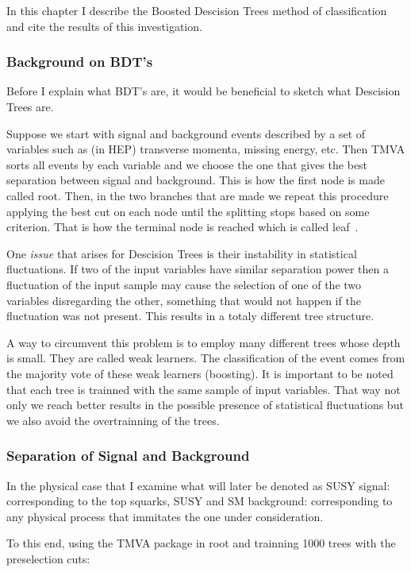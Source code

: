 \documentclass[12pt,a4paper]{report}
\begin{document}
In this chapter I describe the Boosted Descision Trees method of classification and cite the results of this 
investigation.

\subsubsection{Background on BDT's}

Before I explain what BDT's are, it would be beneficial to sketch what Descision Trees are. 

Suppose we start with signal and background events described by a set of variables such as (in HEP) transverse 
momenta, missing energy, etc. Then TMVA sorts all events by each variable and we choose the one that gives the
best separation between signal and background. This is how the first node is made called root. Then, in the two branches 
that are made we repeat this procedure applying the best cut on each node until the splitting stops based on 
some criterion. That is how the terminal node is reached which is called leaf~\cite{hoecker2007tmva}.

One \textit{issue} that arises for Descision Trees is their instability in statistical fluctuations. If two 
of the input variables have similar separation power then a fluctuation of the input sample may cause the 
selection of one of the two variables disregarding the other, something that would not happen if the fluctuation
was not present. This results in a totaly different tree structure.

A way to circumvent this problem is to employ many different trees whose depth is small. They are called
weak learners. The classification of the event comes from the majority vote of these weak learners (boosting).
It is important to be noted that each tree is trainned with the same sample of input variables. That way not 
only we reach better results in the possible presence of statistical fluctuations but we also avoid the 
overtrainning of the trees.

\subsubsection{Separation of Signal and Background}

In the physical case that I examine what will later be denoted as SUSY signal: corresponding to the 
top squarks, SUSY and SM background: corresponding to any physical process that immitates the one under 
consideration.

To this end, using the TMVA package in root and trainning 1000 trees with the  preselection cuts:
\end{document}
